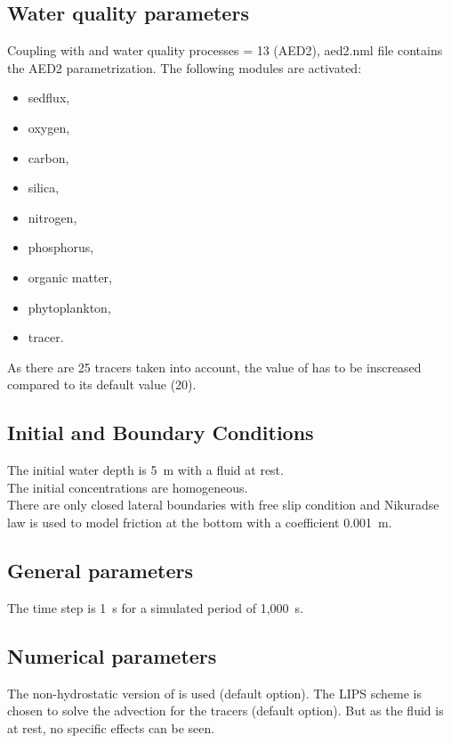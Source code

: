 %
%
\subsection{Water quality parameters}
Coupling with \waqtel and water quality processes = 13 (AED2),
aed2.nml file contains the AED2 parametrization.
The following modules are activated:
\begin{itemize}
\item sedflux,
\item oxygen,
\item carbon,
\item silica,
\item nitrogen,
\item phosphorus,
\item organic matter,
\item phytoplankton,
\item tracer.
\end{itemize}

As there are 25 tracers taken into account, the value of
 has to be inscreased compared to its default
value (20).
%
\subsection{Initial and Boundary Conditions}
%
The initial water depth is 5~m with a fluid at rest.\\
The initial concentrations are homogeneous.\\

There are only closed lateral boundaries with free slip condition and
Nikuradse law is used to model friction at the bottom with a coefficient
0.001~m.
%
\subsection{General parameters}
%
The time step is 1~s for a simulated period of 1,000~s.
%
\subsection{Numerical parameters}
%
The non-hydrostatic version of  is used (default option).
The LIPS scheme is chosen to solve the advection for the tracers
(default option).
But as the fluid is at rest, no specific effects can be seen.
%
